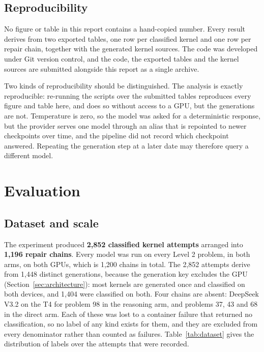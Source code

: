 \documentclass[12pt]{article}
\begin{document}
\subsection{Reproducibility}

No figure or table in this report contains a hand-copied number. Every result
derives from two exported tables, one row per classified kernel and one row per
repair chain, together with the generated kernel sources. The code was developed
under Git version control, and the code, the exported tables and the kernel
sources are submitted alongside this report as a single archive.

Two kinds of reproducibility should be distinguished. The analysis is exactly
reproducible: re-running the scripts over the submitted tables reproduces every
figure and table here, and does so without access to a GPU, but the generations
are not. Temperature is zero, so the model was asked for a deterministic response,
but the provider serves one model through an alias that is repointed to newer
checkpoints over time, and the pipeline did not record which checkpoint
answered. Repeating the generation step at a later date may therefore query a
different model.

\section{Evaluation}

\subsection{Dataset and scale}

The experiment produced \textbf{2{,}852 classified kernel attempts} arranged
into \textbf{1{,}196 repair chains}. Every model was run on every Level 2
problem, in both arms, on both GPUs, which is 1{,}200 chains in total. The
2{,}852 attempts derive from 1{,}448 distinct generations, because the
generation key excludes the GPU (Section~\ref{sec:architecture}): most kernels
are generated once and classified on both devices, and 1{,}404 were classified
on both. Four chains are absent: DeepSeek V3.2 on the T4 for problem 98 in the reasoning arm, and
problems 37, 43 and 68 in the direct arm. Each of these was lost to a container
failure that returned no classification, so no label of any kind exists for
them, and they are excluded from every denominator rather than counted as
failures. Table~\ref{tab:dataset} gives the distribution of labels over the
attempts that were recorded.
\end{document}
